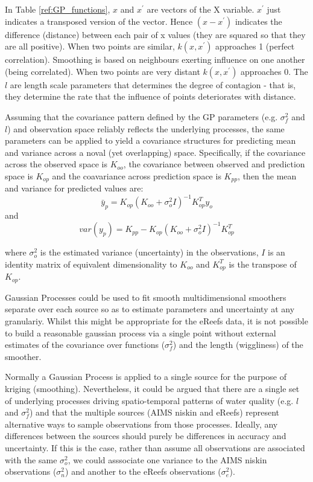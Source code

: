 In Table \ref{ref:GP_functions}, $x$ and $x^\prime$ are vectors of the X variable.  $x^\prime$ just indicates a transposed version of the vector.
Hence $(x-x^\prime)$ indicates the difference (distance) between each pair of x values (they are squared so that they are all positive).
When two points are similar, $k(x,x^\prime)$ approaches 1 (perfect correlation).  Smoothing is based on neighbours exerting influence on one another (being correlated).
When two points are very distant $k(x,x^\prime)$ approaches 0.
The $l$ are length scale parameters that determines the degree of contagion - that is, they determine the rate that the influence
of points deteriorates with distance.

Assuming that the covariance pattern defined by the GP parameters (e.g. $\sigma_f^2$ and $l$) and observation space reliably reflects the underlying processes,
the same parameters can be applied to yield a covariance structures for predicting mean and variance across a noval (yet overlapping) space.  Specifically, if the
covariance across the observed space is $K_{oo}$, the covariance between observed and prediction space is $K_{op}$ and the coavariance across prediction space
is $K_{pp}$, then the mean and variance for predicted values are:\\

$$
\bar{y}_p = K_{op}(K_{oo} + \sigma_o^2I)^{-1}K^T_{op}y_o$$
and 
$$var(y_p) = K_{pp} - K_{op}(K_{oo}+ \sigma_o^2I)^{-1}K^T_{op}$$

where $\sigma_o^2$ is the estimated variance (uncertainty) in the observations, $I$ is an identity matrix of equivalent dimensionality to $K_{oo}$ and $K_{op}^T$ is the transpose of $K_{op}$. 

Gaussian Processes could be used to fit smooth multidimensional smoothers separate over each source so as to estimate
parameters and uncertainty at any granulariy.  Whilst this might be appropriate for the eReefs data,  it is not possible
to build a reasonable gaussian process via a single point without external estimates of the covariance over functions ($\sigma_f^2$)
and the length (wiggliness) of the smoother.

Normally a Gaussian Process is applied to a single source for the purpose of kriging (smoothing).
Nevertheless, it could be argued that there are a single set of underlying processes driving spatio-temporal patterns of water quality (e.g. $l$ and $\sigma_f^2$)
and that the multiple sources (AIMS niskin and eReefs) represent alternative ways to sample observations from those processes.  Ideally, any differences between the sources
should purely be differences in accuracy and uncertainty.  If this is the case, rather than assume all observations are associated with the same $\sigma_o^2$, we could
asssociate one variance to the AIMS niskin observations ($\sigma_n^2$) and another to the eReefs observations ($\sigma_e^2$).

